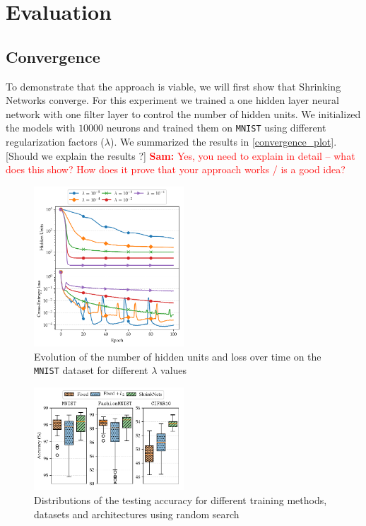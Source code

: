 \documentclass[sigconf]{acmart}
\newcommand{\srm}[1]{\textcolor{red}{{\bf Sam:} #1}}
\begin{document}
\section{Evaluation}
\subsection{Convergence}

To demonstrate that the approach is viable, we will first show that Shrinking Networks converge. For this experiment we trained a one hidden layer neural network with one filter layer to control the number of hidden units. We initialized the models with $10000$ neurons and trained them on \texttt{MNIST} using different regularization factors ($\lambda$). We summarized the results in \autoref{convergence_plot}. [Should we explain the results ?] \srm{Yes, you need to explain in detail -- what does this show?  How does it prove that your approach works / is a good idea?}

\begin{figure}
\begin{center}
\includegraphics[width=0.5\textwidth]{convergence}
\caption{Evolution of the number of hidden units and loss over time on the \texttt{MNIST} dataset for different $\lambda$ values \label{convergence_plot}}
\end{center}
\end{figure}

\begin{figure}
\begin{center}
  \includegraphics[width=0.5\textwidth]{hyper_opt}
\caption{Distributions of the testing accuracy for different training methods, datasets and architectures using random search\label{hyper_opt_res}}
\end{center}
\end{figure}
\end{document}

